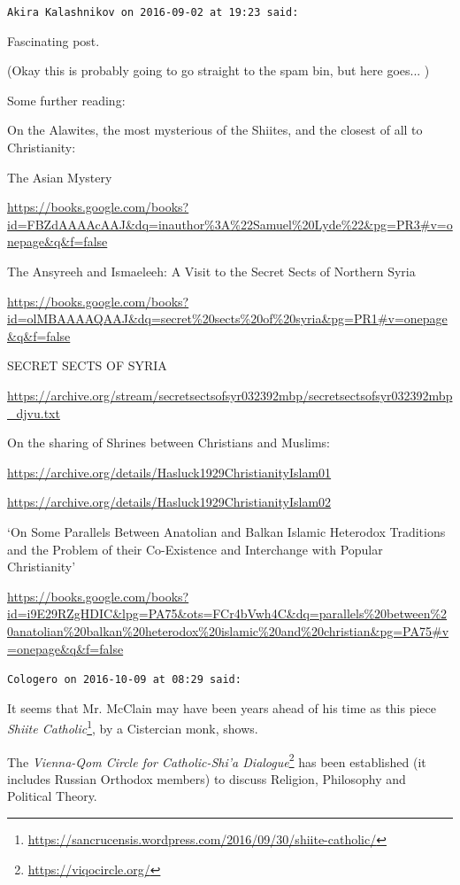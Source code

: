 \begin{footnotesize}
\begin{sffamily}
\texttt{Akira Kalashnikov on 2016-09-02 at 19:23 said:}

Fascinating post.

(Okay this is probably going to go straight to the spam bin, but here goes... )

Some further reading:

On the Alawites, the most mysterious of the Shiites, and the closest of all to Christianity:

The Asian Mystery

\url{https://books.google.com/books?id=FBZdAAAAcAAJ\&dq=inauthor\%3A\%22Samuel\%20Lyde\%22&pg=PR3\#v=onepage\&q\&f=false}


The Ansyreeh and Ismaeleeh: A Visit to the Secret Sects of Northern Syria

\url{https://books.google.com/books?id=olMBAAAAQAAJ\&dq=secret\%20sects\%20of\%20syria\&pg=PR1\#v=onepage\&q\&f=false}


SECRET SECTS OF SYRIA

\url{https://archive.org/stream/secretsectsofsyr032392mbp/secretsectsofsyr032392mbp\_djvu.txt}


On the sharing of Shrines between Christians and Muslims:

\url{https://archive.org/details/Hasluck1929ChristianityIslam01}

\url{https://archive.org/details/Hasluck1929ChristianityIslam02}


`On Some Parallels Between Anatolian and Balkan Islamic Heterodox Traditions and the Problem of their Co-Existence and Interchange with Popular Christianity'

\url{https://books.google.com/books?id=i9E29RZgHDIC\&lpg=PA75\&ots=FCr4bVwh4C\&dq=parallels\%20between\%20anatolian\%20balkan\%20heterodox\%20islamic\%20and\%20christian\&pg=PA75\#v=onepage\&q\&f=false}


\hfill

\texttt{Cologero on 2016-10-09 at 08:29 said:}

It seems that Mr. McClain may have been years ahead of his time as this piece \textit{Shiite Catholic}\footnote{\url{https://sancrucensis.wordpress.com/2016/09/30/shiite-catholic/}}, by a Cistercian monk, shows.

The \textit{Vienna-Qom Circle for Catholic-Shi'a Dialogue}\footnote{\url{https://viqocircle.org/}} has been established (it includes Russian Orthodox members) to discuss Religion, Philosophy and Political Theory.


\end{sffamily}
\end{footnotesize}
